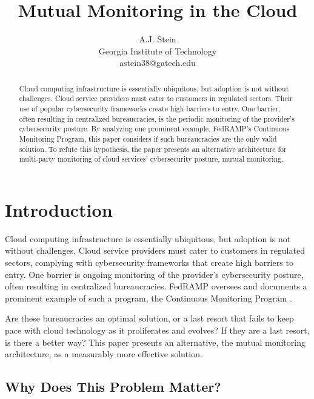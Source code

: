 \documentclass{jdf}
\begin{document}
\title{Mutual Monitoring in the Cloud}
\author{A.J. Stein \\ Georgia Institute of Technology \\ astein38@gatech.edu}

\maketitle
\thispagestyle{fancy}

\begin{abstract}
    Cloud computing infrastructure is essentially ubiquitous, but adoption is not without challenges. Cloud service providers must cater to customers in regulated sectors. Their use of popular cybersecurity frameworks create high barriers to entry. One barrier, often resulting in centralized bureaucracies, is the periodic monitoring of the provider's cybersecurity posture. By analyzing one prominent example, FedRAMP's Continuous Monitoring Program, this paper considers if such bureaucracies are the only valid solution. To refute this hypothesis, the paper presents an alternative architecture for multi-party monitoring of cloud services' cybersecurity posture, mutual monitoring.
\end{abstract}

\section{Introduction}

Cloud computing infrastructure is essentially ubiquitous, but adoption is not without challenges. Cloud service providers must cater to customers in regulated sectors, complying with cybersecurity frameworks that create high barriers to entry. One barrier is ongoing monitoring of the provider's cybersecurity posture, often resulting in centralized bureaucracies. FedRAMP oversees and documents a prominent example of such a program, the Continuous Monitoring Program \citeyear[p.~14]{fedramp_auth_playbook25}.

Are these bureaucracies an optimal solution, or a last resort that fails to keep pace with cloud technology as it proliferates and evolves? If they are a last resort, is there a better way? This paper presents an alternative, the mutual monitoring architecture, as a measurably more effective solution.

\subsection{Why Does This Problem Matter?}
\end{document}
